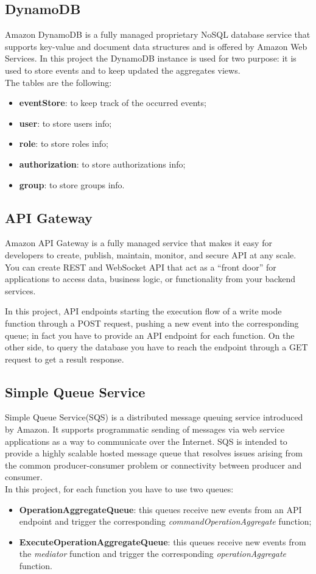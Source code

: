 \subsection{DynamoDB}
Amazon DynamoDB is a fully managed proprietary NoSQL database service that supports key-value and document data structures and is offered by Amazon Web Services.
In this project the DynamoDB instance is used for two purpose: it is used to store events and to keep updated the aggregates views.\\
The tables are the following:
\begin{itemize}
	\item \textbf{eventStore}: to keep track of the occurred events;
	\item \textbf{user}: to store users info;
	\item \textbf{role}: to store roles info;
	\item \textbf{authorization}: to store authorizations info;
	\item \textbf{group}: to store groups info.
\end{itemize}

\subsection{API Gateway}
Amazon API Gateway is a fully managed service that makes it easy for developers to create, publish, maintain, monitor, and secure API at any scale. You can create REST and WebSocket API that act as a “front door” for applications to access data, business logic, or functionality from your backend services.

In this project, API endpoints starting the execution flow of a write mode function through a POST request, pushing a new event into the corresponding queue; in fact you have to provide an API endpoint for each function. On the other side, to query the database you have to reach the endpoint through a GET request to get a result response.

\subsection{Simple Queue Service}
Simple Queue Service(SQS) is a distributed message queuing service introduced by Amazon. It supports programmatic sending of messages via web service applications as a way to communicate over the Internet. SQS is intended to provide a highly scalable hosted message queue that resolves issues arising from the common producer-consumer problem or connectivity between producer and consumer.\\

In this project, for each function you have to use two queues: 
\begin{itemize}
	\item \textbf{OperationAggregateQueue}: this queues receive new events from an API endpoint and trigger the corresponding \emph{commandOperationAggregate} function;
	\item \textbf{ExecuteOperationAggregateQueue}: this queues receive new events from the \emph{mediator} function and trigger the corresponding \emph{operationAggregate} function.
\end{itemize}
